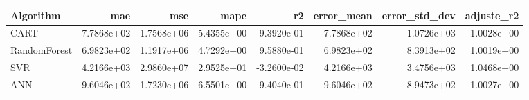 \begin{tabular}{lrrrrrrr}
\toprule
Algorithm & mae & mse & mape & r2 & error_mean & error_std_dev & adjuste_r2 \\
\midrule
CART & 7.7868e+02 & 1.7568e+06 & 5.4355e+00 & 9.3920e-01 & 7.7868e+02 & 1.0726e+03 & 1.0028e+00 \\
RandomForest & 6.9823e+02 & 1.1917e+06 & 4.7292e+00 & 9.5880e-01 & 6.9823e+02 & 8.3913e+02 & 1.0019e+00 \\
SVR & 4.2166e+03 & 2.9860e+07 & 2.9525e+01 & -3.2600e-02 & 4.2166e+03 & 3.4756e+03 & 1.0468e+00 \\
ANN & 9.6046e+02 & 1.7230e+06 & 6.5501e+00 & 9.4040e-01 & 9.6046e+02 & 8.9473e+02 & 1.0027e+00 \\
\bottomrule
\end{tabular}
